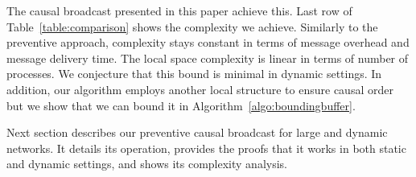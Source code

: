 %     


The causal broadcast presented in this paper achieve this.  Last row of
Table~\ref{table:comparison} shows the complexity we achieve. Similarly to the
preventive approach, complexity stays constant in terms of message overhead and
message delivery time. The local space complexity is linear in terms of number
of processes. We conjecture that this bound is minimal in dynamic settings. In
addition, our algorithm employs another local structure to ensure causal order
but we show that we can bound it in Algorithm~\ref{algo:boundingbuffer}.

Next section describes our preventive causal broadcast for large and dynamic
networks. It details its operation, provides the proofs that it works in both
static and dynamic settings, and shows its complexity analysis.



